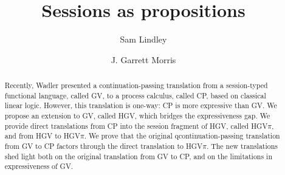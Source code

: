 \documentclass{easychair}
\newcommand{\hgv}{HGV\xspace}
\newcommand{\hgvpi}{HGV$\pi$\xspace}
\begin{document}
\title{Sessions as propositions}



%
\author{
  Sam Lindley
  \and
  J. Garrett Morris
}





\clearpage

\maketitle


\begin{abstract}
Recently, Wadler presented a continuation-passing translation from a session-typed functional
language, called GV, to a process calculus, called CP, based on classical linear logic. However,
this translation is one-way: CP is more expressive than GV. We propose an extension to GV, called
\hgv, which bridges the expressiveness gap. We provide direct translations from CP into the session
fragment of \hgv, called \hgvpi, and from \hgv to \hgvpi. We prove that the original
qcontinuation-passing translation from GV to CP factors through the direct translation to
\hgvpi. The new translations shed light both on the original translation from GV to CP, and on the
limitations in expressiveness of GV.
\end{abstract}
\end{document}

